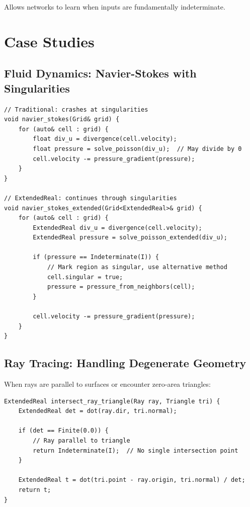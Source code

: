 Allows networks to learn when inputs are fundamentally indeterminate.

\section{Case Studies}

\subsection{Fluid Dynamics: Navier-Stokes with Singularities}

\begin{verbatim}
// Traditional: crashes at singularities
void navier_stokes(Grid& grid) {
    for (auto& cell : grid) {
        float div_u = divergence(cell.velocity);
        float pressure = solve_poisson(div_u);  // May divide by 0
        cell.velocity -= pressure_gradient(pressure);
    }
}

// ExtendedReal: continues through singularities
void navier_stokes_extended(Grid<ExtendedReal>& grid) {
    for (auto& cell : grid) {
        ExtendedReal div_u = divergence(cell.velocity);
        ExtendedReal pressure = solve_poisson_extended(div_u);
        
        if (pressure == Indeterminate(I)) {
            // Mark region as singular, use alternative method
            cell.singular = true;
            pressure = pressure_from_neighbors(cell);
        }
        
        cell.velocity -= pressure_gradient(pressure);
    }
}
\end{verbatim}

\subsection{Ray Tracing: Handling Degenerate Geometry}

When rays are parallel to surfaces or encounter zero-area triangles:

\begin{verbatim}
ExtendedReal intersect_ray_triangle(Ray ray, Triangle tri) {
    ExtendedReal det = dot(ray.dir, tri.normal);
    
    if (det == Finite(0.0)) {
        // Ray parallel to triangle
        return Indeterminate(I);  // No single intersection point
    }
    
    ExtendedReal t = dot(tri.point - ray.origin, tri.normal) / det;
    return t;
}
\end{verbatim}

